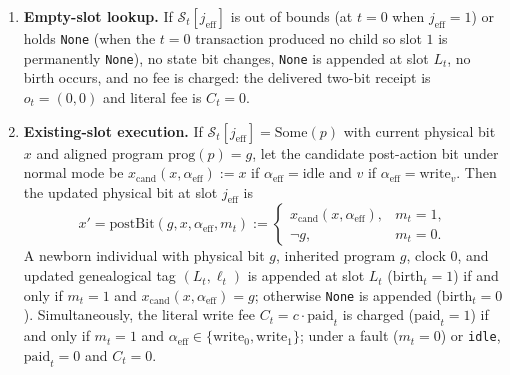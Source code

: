 \documentclass[11pt,a4paper]{article}
\providecommand{\tightlist}{\setlength{\itemsep}{2pt}\setlength{\parskip}{0pt}}
\begin{document}
\begin{enumerate}
\def\labelenumi{\arabic{enumi}.}
\tightlist
\item
  \textbf{Empty-slot lookup.} If \(\mathcal{S}_t[j_{\mathrm{eff}}]\) is
  out of bounds (at \(t = 0\) when \(j_{\mathrm{eff}} = 1\)) or holds
  \texttt{None} (when the \(t=0\) transaction produced no child so slot
  \(1\) is permanently \texttt{None}), no state bit changes,
  \texttt{None} is appended at slot \(L_t\), no birth occurs, and no fee
  is charged: the delivered two-bit receipt is \(o_t = (0, 0)\) and
  literal fee is \(C_t = 0\).
\item
  \textbf{Existing-slot execution.} If
  \(\mathcal{S}_t[j_{\mathrm{eff}}] = \mathrm{Some}(p)\) with current
  physical bit \(x\) and aligned program \(\mathrm{prog}(p) = g\), let
  the candidate post-action bit under normal mode be
  \(x_{\mathrm{cand}}(x, \alpha_{\mathrm{eff}}) := x\) if
  \(\alpha_{\mathrm{eff}} = \mathrm{idle}\) and \(v\) if
  \(\alpha_{\mathrm{eff}} = \mathrm{write}_v\). Then the updated
  physical bit at slot \(j_{\mathrm{eff}}\) is
  \[x' = \mathrm{postBit}(g, x, \alpha_{\mathrm{eff}}, m_t) := \begin{cases} x_{\mathrm{cand}}(x, \alpha_{\mathrm{eff}}), & m_t = 1, \\ \neg g, & m_t = 0. \end{cases}\]
  A newborn individual with physical bit \(g\), inherited program \(g\),
  clock \(0\), and updated genealogical tag \((L_t, \ell_t)\) is
  appended at slot \(L_t\) (\(\mathrm{birth}_t = 1\)) if and only if
  \(m_t = 1\) and \(x_{\mathrm{cand}}(x, \alpha_{\mathrm{eff}}) = g\);
  otherwise \texttt{None} is appended (\(\mathrm{birth}_t = 0\)).
  Simultaneously, the literal write fee
  \(C_t = c \cdot \mathrm{paid}_t\) is charged (\(\mathrm{paid}_t = 1\))
  if and only if \(m_t = 1\) and
  \(\alpha_{\mathrm{eff}} \in \{\mathrm{write}_0, \mathrm{write}_1\}\);
  under a fault (\(m_t = 0\)) or \texttt{idle}, \(\mathrm{paid}_t = 0\)
  and \(C_t = 0\).
\end{enumerate}
\end{document}
